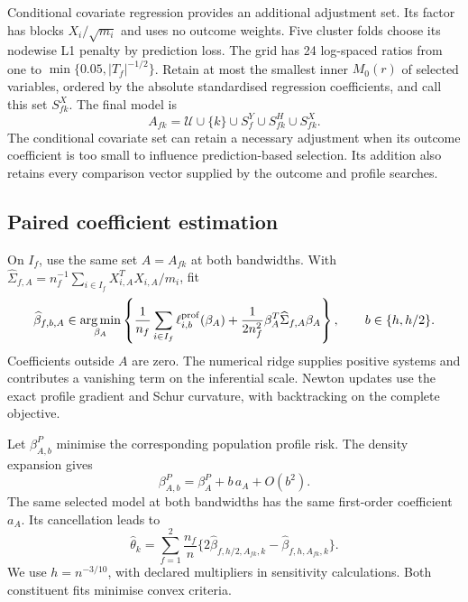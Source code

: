 Conditional covariate regression provides an additional adjustment set.
Its factor has blocks $X_i/\sqrt{m_i}$ and uses no outcome weights.
Five cluster folds choose its nodewise L1 penalty by prediction loss.
The grid has 24 log-spaced ratios from one to
$\min\{0.05,|T_f|^{-1/2}\}$. Retain at most the smallest inner $M_0(r)$
of selected variables, ordered by the absolute standardised regression
coefficients, and call this set $S_{fk}^X$. The final model is
\begin{equation}\label{eq:selected-set}
 A_{fk}=\mathcal U\cup\{k\}\cup S_f^Y\cup S_{fk}^H\cup S_{fk}^X.
\end{equation}
The conditional covariate set can retain a necessary adjustment when
its outcome coefficient is too small to influence prediction-based
selection. Its addition also retains every comparison vector supplied
by the outcome and profile searches.

\subsection{Paired coefficient estimation}\label{subsec:paired-fit}

On $I_f$, use the same set $A=A_{fk}$ at both bandwidths. With
$\widehat\Sigma_{f,A}=n_f^{-1}\sum_{i\in I_f}X_{i,A}^TX_{i,A}/m_i$,
fit
\begin{equation}\label{eq:joint-selected-fit}
 \widehat\beta_{f,b,A}\in\operatorname*{arg\,min}_{\beta_A}
 \left\{\frac1{n_f}\sum_{i\in I_f}\ell_{i,b}^{\mathrm{prof}}(\beta_A)
             +\frac{1}{2n_f^2}\beta_A^T\widehat\Sigma_{f,A}\beta_A\right\},
 \qquad b\in\{h,h/2\}.
\end{equation}
Coefficients outside $A$ are zero. The numerical ridge supplies
positive systems and contributes a vanishing term on the inferential
scale. Newton updates use the exact profile gradient and Schur
curvature, with backtracking on the complete objective.

Let $\beta_{A,b}^P$ minimise the corresponding population profile risk.
The density expansion gives
\begin{equation}\label{eq:coefficient-bandwidth-expansion}
 \beta_{A,b}^P=\beta_A^P+b\,a_A+O(b^2).
\end{equation}
The same selected model at both bandwidths has the same first-order
coefficient $a_A$. Its cancellation leads to
\begin{equation}\label{eq:joint-estimator}
 \widehat\theta_k=\sum_{f=1}^2\frac{n_f}{n}
       \{2\widehat\beta_{f,h/2,A_{fk},k}
                         -\widehat\beta_{f,h,A_{fk},k}\}.
\end{equation}
We use $h=n^{-3/10}$, with declared multipliers in sensitivity
calculations. Both constituent fits minimise convex criteria.

